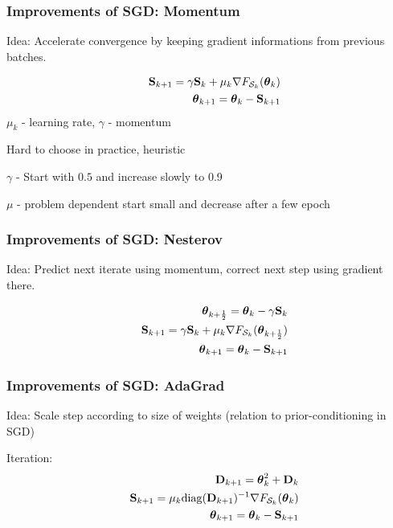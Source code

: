 \documentclass[12pt,fleqn,beamer]{beamer}
\begin{document}
\begin{frame}[fragile]\frametitle{Improvements of SGD: Momentum}

Idea: Accelerate convergence by keeping gradient informations from previous batches.


\begin{eqnarray*}
&& {\bf S}_{k+1} = \gamma {\bf S}_k  +\mu_k  \nabla F_{{\cal S}_k}({\boldsymbol \theta}_k) \\
&& {\boldsymbol \theta}_{k+1} = {\boldsymbol \theta}_k  - {\bf S}_{k+1}
\end{eqnarray*}
$\mu_k$ - learning rate, $\gamma$ - momentum 


\bigskip
\pause

Hard to choose in practice, heuristic

$\gamma$ - Start with $0.5$ and increase slowly to 0.9

$\mu$ - problem dependent start small and decrease after a few epoch


\end{frame}

\begin{frame}\frametitle{Improvements of SGD: Nesterov}

	Idea: Predict next iterate using momentum, correct next step using gradient there.
	
	\begin{eqnarray*}
	&& {\boldsymbol \theta}_{k+\frac 12} = {\boldsymbol \theta}_k  - \gamma {\bf S}_{k} \\
	&& {\bf S}_{k+1} = \gamma {\bf S}_k  + \mu_k  \nabla F_{{\cal S}_k}({{\boldsymbol \theta}_{k+\frac12}}) \\
	&& {\boldsymbol \theta}_{k+1} = {\boldsymbol \theta}_k  - {\bf S}_{k+1}
	\end{eqnarray*}
\end{frame}

\begin{frame}
	\frametitle{Improvements of SGD: AdaGrad}
	
	Idea: Scale step according to size of weights (relation to prior-conditioning in SGD)
	
	\bigskip
	
	
	Iteration:
	\begin{eqnarray*}
	&& {\bf D}_{k+1} = {\boldsymbol \theta}_k^2 + {\bf D}_k \\
	&& {\bf S}_{k+1} =  \mu_k {\rm diag}({\bf D}_{k+1})^{-1} \nabla F_{{\cal S}_k}({\boldsymbol \theta}_{k}) \\
	&& {\boldsymbol \theta}_{k+1} = {\boldsymbol \theta}_k  - {\bf S}_{k+1}
	\end{eqnarray*}
	
	
\end{frame}
\end{document}
